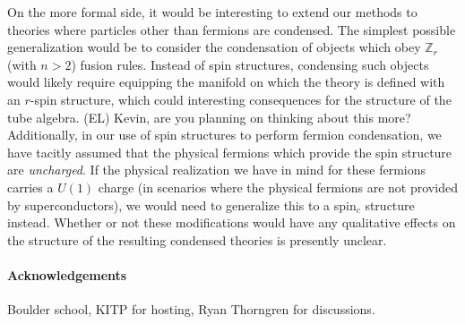 \documentclass[12pt,a4paper]{article}
\newcommand{\zz}{\mathbb{Z}}
\newcommand{\mcc}{\mathcal{C}}
\newcommand{\dave}[1]{{\color{ao(english)}\footnotesize{(DA) #1}}}
\newcommand{\ethan}[1]{{\color{amethyst}\footnotesize{(EL) #1}}}
\begin{document}

On the more formal side, it would be interesting to extend our methods to theories where particles other than fermions are condensed. 
The simplest possible generalization would be to consider the condensation of objects which obey $\zz_r$ (with $n>2$) fusion rules. 
Instead of spin structures, condensing such objects would likely require equipping the manifold on which the theory is defined with an $r$-spin structure, which could interesting consequences for the structure of the 
tube algebra. \ethan{Kevin, are you planning on thinking about this more?} 
Additionally, in our use of spin structures %
to perform fermion condensation, we have tacitly assumed that the physical fermions which provide the spin structure are {\it uncharged}. 
If the physical realization we have in mind for these fermions carries a $U(1)$ charge (in scenarios where 
the physical fermions are not provided by superconductors), we would need to generalize this to a spin$_c$ structure instead. 
Whether or not these modifications would have any qualitative effects on the structure of the resulting condensed theories 
is presently unclear.  


 
 \paragraph{Acknowledgements}
 Boulder school, KITP for hosting, Ryan Thorngren for discussions. 
 
 

{}




\clearpage
\appendix
\end{document}
